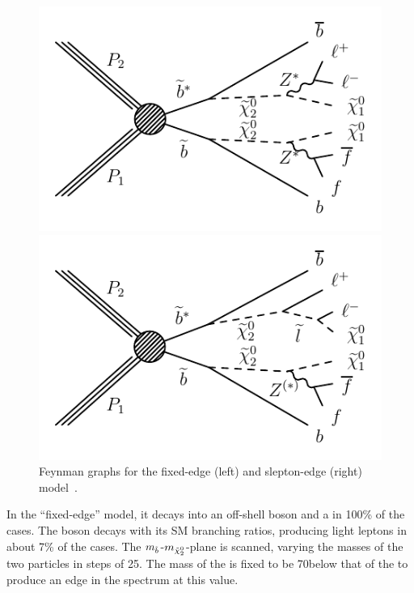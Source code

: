 \begin{figure}[htbp]
\centering
\begin{minipage}[t]{0.49\textwidth}
  \includegraphics[width=\textwidth]{plots/THEO/Feynman_graph_T6bblledge.pdf}
\end{minipage}
\begin{minipage}[t]{0.49\textwidth}
\includegraphics[width=\textwidth]{plots/THEO/Feynman_graph_T6bbslepton.pdf}
\end{minipage}
\caption{Feynman graphs for the fixed-edge (left) and slepton-edge (right) model~\cite{Khachatryan:2015lwa}.}
\label{fig:sigFeyn}
\end{figure}

 In the ``fixed-edge'' model, it decays into an off-shell \Z boson and a \firstchi in 100\% of the cases. The \Z boson decays with its SM branching ratios, producing light leptons in about 7\% of the cases. The $m_{\tilde{b}}$-$m_{{\tilde{\chi}^0_2}}$-plane is scanned, varying the masses of the two particles in steps of 25\GeV. The mass of the \firstchi is fixed to be 70\GeV below that of the \secondchi to produce an edge in the \mll spectrum at this value.

